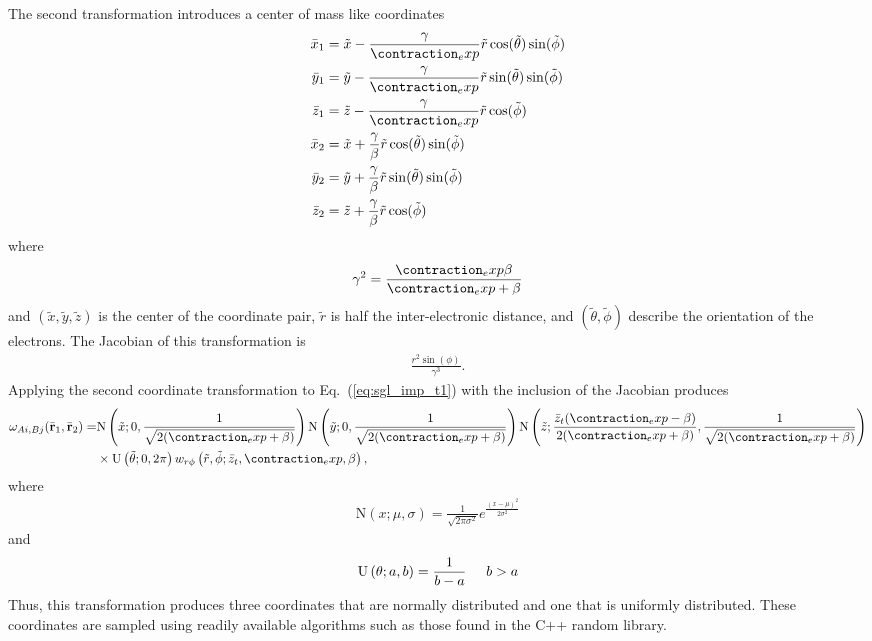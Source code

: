\documentclass{revtex4}
\begin{document}
  The second transformation introduces a center of mass like coordinates 
  \begin{align}
    \bar{x}_1 &= \tilde{x} - \frac{\gamma}{\contraction_exp} \tilde{r} \cos(\tilde{\theta}) \sin(\tilde{\phi}) \\
    \bar{y}_1 &= \tilde{y} - \frac{\gamma}{\contraction_exp} \tilde{r} \sin(\tilde{\theta}) \sin(\tilde{\phi}) \\
    \bar{z}_1 &= \tilde{z} - \frac{\gamma}{\contraction_exp} \tilde{r} \cos(\tilde{\phi}) \\
    \bar{x}_2 &= \tilde{x} + \frac{\gamma}{\beta} \tilde{r} \cos(\tilde{\theta}) \sin(\tilde{\phi}) \\
    \bar{y}_2 &= \tilde{y} + \frac{\gamma}{\beta} \tilde{r} \sin(\tilde{\theta}) \sin(\tilde{\phi}) \\
    \bar{z}_2 &= \tilde{z} + \frac{\gamma}{\beta} \tilde{r} \cos(\tilde{\phi})
  \end{align}
  where
  \begin{align}
    \gamma^2 = \frac{\contraction_exp \beta}{\contraction_exp + \beta}
  \end{align}
  and
  $(\tilde{x}, \tilde{y}, \tilde{z})$ is the center of the coordinate pair, $\tilde{r}$ is half the inter-electronic distance, and $(\tilde{\theta}, \tilde{\phi})$ describe the orientation of
  the electrons.
  The Jacobian of this transformation is
  \begin{align}
    \frac{r^2 \sin (\phi )}{\gamma ^3}.
  \end{align}
  Applying the second coordinate transformation to Eq.\ (\ref{eq:sgl_imp_t1}) with the inclusion of the Jacobian produces
  \begin{align}
    \omega_{Ai,Bj}(\bar{\mathbf{r}}_1, \bar{\mathbf{r}}_2) =& 
    \mathrm{N}\left(\tilde{x}; 0, \frac{1}{\sqrt{2(\contraction_exp + \beta)}}\right)
    \mathrm{N}\left(\tilde{y}; 0, \frac{1}{\sqrt{2(\contraction_exp + \beta)}}\right)
    \mathrm{N}\left(\tilde{z}; \frac{\bar{z}_t (\contraction_exp -\beta )}{2 (\contraction_exp +\beta )}, \frac{1}{\sqrt{2(\contraction_exp + \beta)}}\right) \nonumber \\
    & \times \mathrm{U}\left(\tilde{\theta}; 0, 2 \pi\right)
    w_{r\phi}\left(\tilde{r}, \tilde{\phi}; \bar{z}_t, \contraction_exp, \beta\right),
    \label{eq:sgl_imp_t2}
  \end{align}
  where 
  \begin{align}
    \mathrm{N}\left(x; \mu, \sigma\right) = \frac{1}{\sqrt{2\pi \sigma^2}} e^{\frac{(x-\mu)^2}{2 \sigma^2}}
  \end{align}
  and
  \begin{align}
    \mathrm{U}\left(\theta; a, b\right) = \frac{1}{b - a} \hspace{5mm} b>a
  \end{align}
  Thus, this transformation produces three coordinates that are normally distributed and one that is uniformly distributed. These coordinates are sampled using readily available algorithms such
  as those found in the C++ random library. 
  
\end{document}
